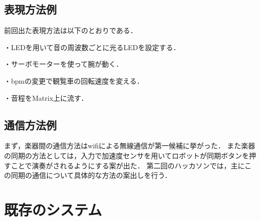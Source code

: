 \documentclass[uplatex,dvipdfmx]{jlreq}
\begin{document}
\subsection{表現方法例}
前回出た表現方法は以下のとおりである．\par
・LEDを用いて音の周波数ごとに光るLEDを設定する．\par
・サーボモーターを使って腕が動く．\par
・bpmの変更で観覧車の回転速度を変える．\par
・音程をMatrix上に流す．\par

\subsection{通信方法例}
まず，楽器間の通信方法はwifiによる無線通信が第一候補に挙がった．
また楽器の同期の方法としては，入力で加速度センサを用いてロボットが同期ボタンを押すことで演奏がされるようにする案が出た．
第二回のハッカソンでは，主にこの同期の通信について具体的な方法の案出しを行う．


\section{既存のシステム}



\end{document}
